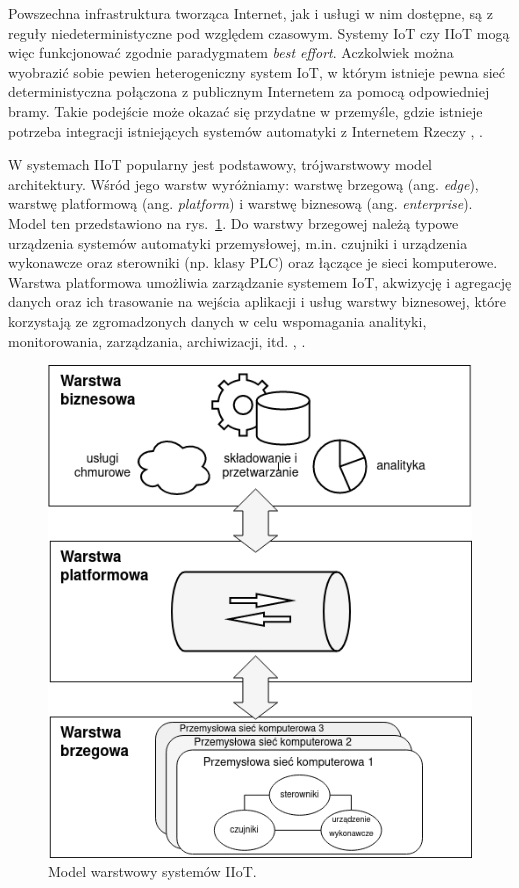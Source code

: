 \documentclass[a4paper, 12pt, twoside]{article}
\begin{document}
Powszechna infrastruktura tworząca Internet, jak i usługi w nim dostępne, są z reguły
niedeterministyczne pod względem czasowym. Systemy IoT czy IIoT mogą więc
funkcjonować zgodnie paradygmatem \emph{best effort}. Aczkolwiek można wyobrazić
sobie pewien heterogeniczny system
IoT, w którym istnieje pewna sieć deterministyczna połączona z publicznym Internetem
za pomocą odpowiedniej bramy. Takie podejście może okazać się przydatne w przemyśle, gdzie
istnieje potrzeba integracji istniejących systemów automatyki z Internetem Rzeczy
\cite{iiot-design-and-impl-gateway}, \cite{iiot-rapid-integration-framework}.

W systemach IIoT popularny jest podstawowy, trójwarstwowy model architektury. Wśród jego
warstw wyróżniamy: warstwę brzegową (ang. \emph{edge}), warstwę platformową (ang. \emph{platform})
i warstwę biznesową (ang. \emph{enterprise}).
Model ten przedstawiono na rys.~\ref{fig:iiot-arch}. Do warstwy brzegowej należą
typowe urządzenia systemów automatyki przemysłowej, m.in. czujniki i urządzenia wykonawcze oraz
sterowniki (np. klasy PLC) oraz łączące je sieci komputerowe. Warstwa platformowa umożliwia zarządzanie
systemem IoT, akwizycję i agregację danych oraz ich trasowanie na wejścia
aplikacji i usług warstwy biznesowej, które
korzystają ze zgromadzonych danych w celu wspomagania
analityki, monitorowania, zarządzania, archiwizacji, itd. \cite{iiot-challenges-opportunities-directions},  \cite{models-innovative-iot}.

\begin{figure}
      \centering
      \includegraphics[scale=0.50]{iiot_arch.png}
      \caption{Model warstwowy systemów IIoT.}
      \label{fig:iiot-arch}
\end{figure}
\end{document}
